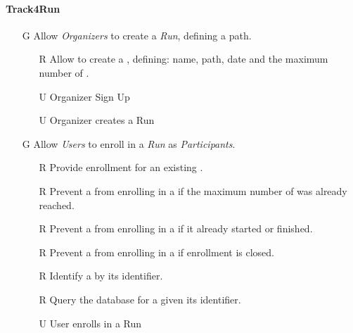 \documentclass[../../rasd.tex]{subfiles}
\begin{document}
        \paragraph{Track4Run}
        \begin{itemize}
            \item[G\subs{8}]Allow \textit{Organizers} to create a \textit{Run}, defining a path.
            \begin{itemize}
                \item[R\subs{39}]Allow  to create a , defining: name, path, date and the maximum number of . 
                \\
                \item[U\subs{12}]Organizer Sign Up  
                \item[U\subs{13}]Organizer creates a Run
            \end{itemize}

            \item[G\subs{9}]Allow \textit{Users} to enroll in a \textit{Run} as \textit{Participants}. 
            \begin{itemize}
                \item[R\subs{40}]Provide  enrollment for an existing .
                \item[R\subs{41}]Prevent a  from enrolling in a  if the maximum number of  was already reached.
                \item[R\subs{42}]Prevent a  from enrolling in a  if it already started or finished.
                \item[R\subs{43}]Prevent a  from enrolling in a  if enrollment is closed.
                \item[R\subs{45}]Identify a  by its identifier.
                \item[R\subs{46}]Query the database for a  given its identifier.
                \\
                \item[U\subs{14}]User enrolls in a Run
            \end{itemize}


\end{itemize}
\end{document}
